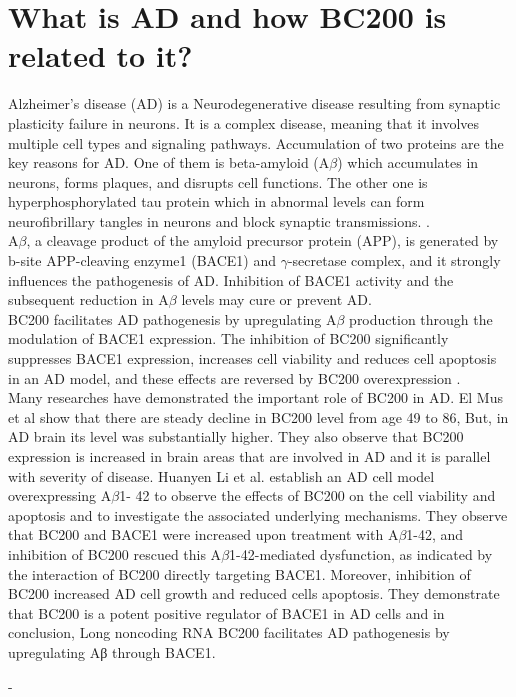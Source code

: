 \documentclass{article}
\begin{document}
\section{What is AD and how BC200 is related to it?}
Alzheimer's disease (AD) is a Neurodegenerative disease resulting from synaptic plasticity failure in neurons\cite{mus2007dendritic}. It is a complex disease, meaning that it involves multiple cell types and signaling pathways\cite{zhang2021role}.
Accumulation of two proteins are the key reasons for AD. One of them is beta-amyloid (A$\beta$) which accumulates in neurons, forms plaques, and disrupts cell functions. The other one is hyperphosphorylated tau protein which in abnormal levels can form neurofibrillary tangles in neurons and block synaptic transmissions. \cite{zhang2021role}.\\
A$\beta$, a cleavage product of the amyloid precursor protein (APP), is generated by b-site APP-cleaving enzyme1 (BACE1) and $\gamma$-secretase complex, and it strongly influences the pathogenesis of AD. Inhibition of BACE1 activity and the subsequent reduction in A$\beta$ levels may cure or prevent AD\cite{li2018identification,zhang2021role}.\\
BC200 facilitates AD pathogenesis by upregulating A$\beta$ production through the modulation of BACE1 expression. The inhibition of BC200 significantly suppresses BACE1 expression, increases cell viability and reduces cell apoptosis in an AD model, and these effects are reversed by BC200 overexpression \cite{li2018identification,zhang2021role}. \\
Many researches have demonstrated the important role of BC200 in AD. El Mus et al\cite{mus2007dendritic} show that there are steady decline in BC200 level from age 49 to 86, But, in AD brain its level was substantially higher. They also observe that BC200 expression is increased in brain areas that are involved in AD and it is parallel with severity of disease. Huanyen Li et al.\cite{li2018identification} establish an AD cell model overexpressing A$\beta$1- 42 to observe the effects of BC200 on the cell viability and apoptosis and to investigate the associated underlying mechanisms. They observe that BC200 and BACE1 were increased upon treatment with A$\beta$1-42, and inhibition of BC200 rescued this A$\beta$1-42-mediated dysfunction, as indicated by the interaction of BC200 directly targeting BACE1. Moreover, inhibition of BC200 increased AD cell growth and reduced cells apoptosis. They demonstrate that BC200 is a potent positive regulator of BACE1 in AD cells and in conclusion, Long noncoding RNA BC200 facilitates AD pathogenesis by upregulating Aβ through BACE1.  					 			 		 	 



- 



\end{document}
